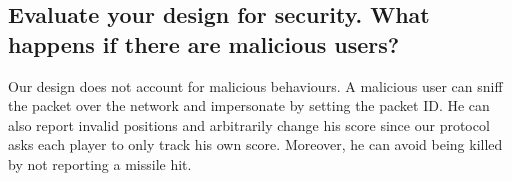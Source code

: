 \documentclass[11pt]{article} %
\begin{document}
\subsection{Evaluate your design for security. 
What happens if there are malicious users?}
Our design does not account for malicious behaviours. A malicious user can sniff the packet over
the network and impersonate by setting the packet ID. He can also report invalid positions and
arbitrarily change his score since our protocol asks each player to only track his own score.
Moreover, he can avoid being killed by not reporting a missile hit.
\end{document}

